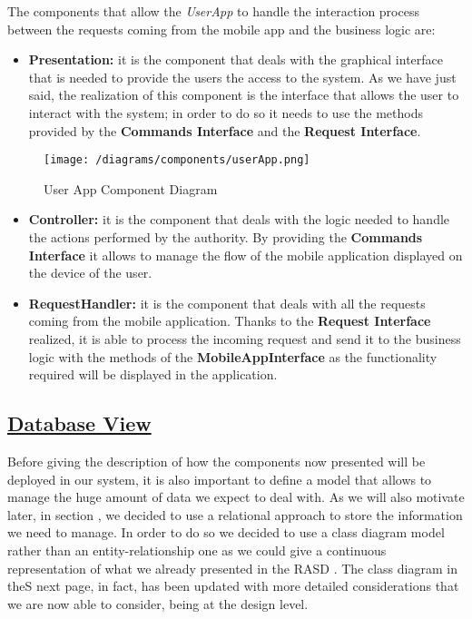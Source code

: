 			The components that allow the \emph{UserApp} to handle the interaction process between the requests coming from the mobile app and the business logic are:
			
			\begin{itemize}
				\item \textbf{Presentation:} it is the component that deals with the graphical interface that is needed to provide the users the access to the system. As we have just said, the realization of this component is the interface that allows the user to interact with the system; in order to do so it needs to use the methods provided by the \textbf{Commands Interface} and the \textbf{Request Interface}.
			\end{itemize}
			
			\begin{figure}[ht]
				\centering
				\texttt{[image: /diagrams/components/userApp.png]}
				\caption{\label{fig:userAppComp} User App Component Diagram}
			\end{figure}
		
			\begin{itemize}
				\item \textbf{Controller:} it is the component that deals with the logic needed to handle the actions performed by the authority. By providing the \textbf{Commands Interface} it allows to manage the flow of the mobile application displayed on the device of the user.
				
				\item \textbf{RequestHandler:} it is the component that deals with all the requests coming from the mobile application. Thanks to the \textbf{Request Interface} realized, it is able to process the incoming request and send it to the business logic with the methods of the \textbf{MobileAppInterface} as the functionality required will be displayed in the application.
			\end{itemize}
			
	\subsection[Database View]{\hyperlink{toc}{Database View}}
		\label{sec:databaseView}
		
		Before giving the description of how the components now presented will be deployed in our system, it is also important to define a model that allows to manage the huge amount of data we expect to deal with. As we will also motivate later, in section , we decided to use a relational approach to store the information we need to manage. In order to do so we decided to use a class diagram model rather than an entity-relationship one as we could give a continuous representation of what we already presented in the RASD \cite{RASD}. The class diagram in theS next page, in fact, has been updated with more detailed considerations that we are now able to consider, being at the design level.\\
		
